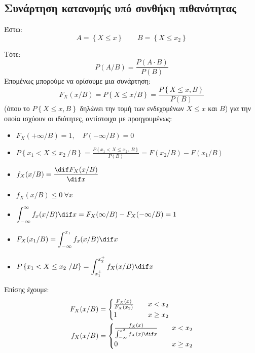 \documentclass[11pt,a4paper,notitlepage,fleqn,final]{article}
\begin{document}
	\subsection{Συνάρτηση κατανομής υπό συνθήκη πιθανότητας}
	Έστω:
	\[
	A = \left\lbrace X \leq x \right\rbrace
	\qquad
	B = \left\lbrace X \leq x_2 \right\rbrace
	\]

	Τότε:
	\[
	P(A/B) = \frac{P(A\cdot B)}{P(B)}
	\]
	Επομένως μπορούμε να ορίσουμε μια συνάρτηση:
	\[
	\boxed{
		F_X(x/B) = P\left\lbrace X\leq x/B \right\rbrace
		= \frac{P\left\lbrace X\leq x, B \right\rbrace}{P(B)}
		}
	\]
	(όπου το \( P\left\{X\leq x,B\right\}  \) δηλώνει την τομή των
	ενδεχομένων \( X\leq x \) και \(B\))
	για την οποία ισχύουν οι ιδιότητες, αντίστοιχα με προηγουμένως:

	\begin{itemize}
		\item \( F_X(+\infty/B) = 1, \quad F(-\infty/B) = 0 \)
		\item \( \displaystyle
		P\left\lbrace x_1<X\leq x_2\ /B \right\rbrace
		=\frac{P\left\lbrace x_1 < X\leq x_2,\ B \right\rbrace}{P(B)}
		=F(x_2/B) - F(x_1/B) \)
		\item \( \displaystyle f_X(x/B) = \frac{\dif F_X(x/B)}{\dif x} \)
		\item \( f_X(x/B) \leq 0 \ \forall x \)
		\item \( \displaystyle
		\int_{-\infty}^{\infty} f_x(x/B) \dif x = F_X(\infty/B)
		- F_X(-\infty/B) = 1 \)
		\item \( \displaystyle F_X(x_1/B) = \int_{-\infty}^{x_1} f_x(x/B)\dif x \)
		\item \( \displaystyle P \left\lbrace x_1<X\leq x_2\ /B \right\rbrace
		= \int_{x_1^+}^{x_2^+} f_X(x/B)\dif x \)
	\end{itemize}

	Επίσης έχουμε:
	\begin{align*}
		F_X(x/B) &= \begin{cases}
		\frac{F_X(x)}{F_X(x_2)} &\quad x<x_2 \\
		1 &\quad x\geq x_2
		\end{cases} \\
		f_X(x/B) &= \begin{cases}
		\frac{f_X(x)}{\int_{-\infty}^{x^2} f_X(x) \dif x}
		&\quad x<x_2 \\ 0 &\quad x \geq x_2
		\end{cases}
	\end{align*}
\end{document}
